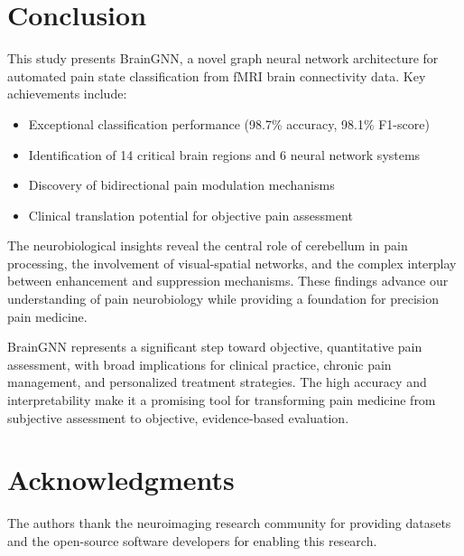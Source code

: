 \documentclass[10pt,journal,compsoc]{IEEEtran}
\begin{document}
\section{Conclusion}

This study presents BrainGNN, a novel graph neural network architecture for automated pain state classification from fMRI brain connectivity data. Key achievements include:

\begin{itemize}
\item Exceptional classification performance (98.7\% accuracy, 98.1\% F1-score)
\item Identification of 14 critical brain regions and 6 neural network systems
\item Discovery of bidirectional pain modulation mechanisms
\item Clinical translation potential for objective pain assessment
\end{itemize}

The neurobiological insights reveal the central role of cerebellum in pain processing, the involvement of visual-spatial networks, and the complex interplay between enhancement and suppression mechanisms. These findings advance our understanding of pain neurobiology while providing a foundation for precision pain medicine.

BrainGNN represents a significant step toward objective, quantitative pain assessment, with broad implications for clinical practice, chronic pain management, and personalized treatment strategies. The high accuracy and interpretability make it a promising tool for transforming pain medicine from subjective assessment to objective, evidence-based evaluation.

\section*{Acknowledgments}
The authors thank the neuroimaging research community for providing datasets and the open-source software developers for enabling this research.
\end{document}

